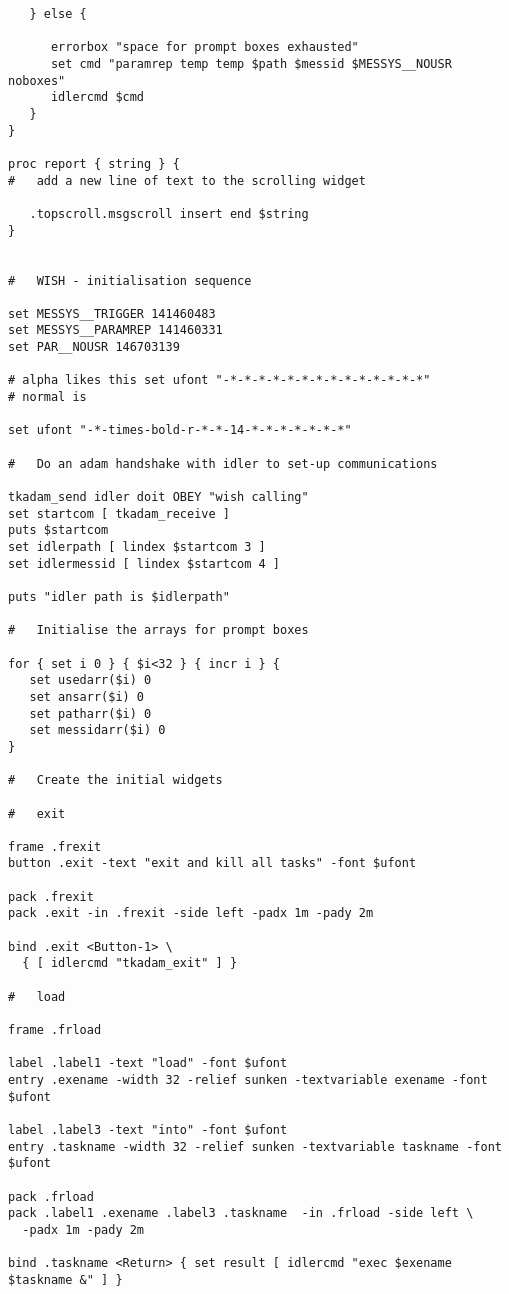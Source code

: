 \begin{verbatim}
   } else {

      errorbox "space for prompt boxes exhausted"
      set cmd "paramrep temp temp $path $messid $MESSYS__NOUSR noboxes"
      idlercmd $cmd
   }
}

proc report { string } {
#   add a new line of text to the scrolling widget

   .topscroll.msgscroll insert end $string
}


#   WISH - initialisation sequence

set MESSYS__TRIGGER 141460483
set MESSYS__PARAMREP 141460331
set PAR__NOUSR 146703139

# alpha likes this set ufont "-*-*-*-*-*-*-*-*-*-*-*-*-*-*"
# normal is

set ufont "-*-times-bold-r-*-*-14-*-*-*-*-*-*-*"

#   Do an adam handshake with idler to set-up communications

tkadam_send idler doit OBEY "wish calling"
set startcom [ tkadam_receive ]
puts $startcom
set idlerpath [ lindex $startcom 3 ]
set idlermessid [ lindex $startcom 4 ]

puts "idler path is $idlerpath"

#   Initialise the arrays for prompt boxes

for { set i 0 } { $i<32 } { incr i } {
   set usedarr($i) 0
   set ansarr($i) 0
   set patharr($i) 0
   set messidarr($i) 0
}

#   Create the initial widgets

#   exit

frame .frexit
button .exit -text "exit and kill all tasks" -font $ufont

pack .frexit
pack .exit -in .frexit -side left -padx 1m -pady 2m

bind .exit <Button-1> \
  { [ idlercmd "tkadam_exit" ] }

#   load

frame .frload

label .label1 -text "load" -font $ufont
entry .exename -width 32 -relief sunken -textvariable exename -font $ufont

label .label3 -text "into" -font $ufont
entry .taskname -width 32 -relief sunken -textvariable taskname -font $ufont

pack .frload
pack .label1 .exename .label3 .taskname  -in .frload -side left \
  -padx 1m -pady 2m

bind .taskname <Return> { set result [ idlercmd "exec $exename $taskname &" ] }


\end{verbatim}
